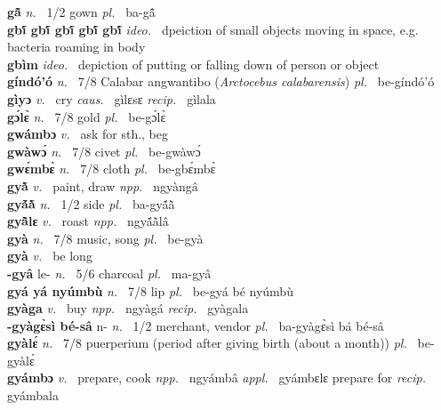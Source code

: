 \noindent
{\bfseries gã̂}  {\itshape n.~} 1/2 gown {\itshape pl.~} ba-gã̂    \\ 
{\bfseries gbĩ́ gbĩ́ gbĩ́ gbĩ́ gbĩ́}  {\itshape ideo.~} dpeiction of small objects moving in space, e.g. bacteria roaming in body    \\ 
{\bfseries gbìm}  {\itshape ideo.~} depiction of putting or falling down of person or object    \\ 
{\bfseries gíndó'ó} {\itshape n.~} 7/8 Calabar angwantibo ({\itshape Arctocebus calabarensis}) {\itshape pl.~} be-gíndó'ó    \\ 
{\bfseries gìyɔ}  {\itshape v.~} cry   {\itshape caus.~} gìlɛsɛ {\itshape recip.~} gìlala  \\ 
{\bfseries gɔ́lɛ̀}  {\itshape n.~} 7/8 gold {\itshape pl.~} be-gɔ́lɛ̀    \\ 
{\bfseries gwámbɔ}  {\itshape v.~} ask for sth., beg    \\ 
{\bfseries gwàwɔ́}  {\itshape n.~} 7/8 civet {\itshape pl.~} be-gwàwɔ́    \\ 
{\bfseries gwɛ́mbɛ̀}  {\itshape n.~} 7/8 cloth {\itshape pl.~} be-gbɛ́mbɛ̀    \\ 
{\bfseries gyã̀}  {\itshape v.~} paint, draw   {\itshape npp.~} ngyàngâ  \\ 
{\bfseries gyã́ã̀}  {\itshape n.~} 1/2 side {\itshape pl.~} ba-gyã́ã̀    \\ 
{\bfseries gyã̂lɛ}  {\itshape v.~} roast   {\itshape npp.~} ngyã́ã̀lâ  \\ 
{\bfseries gyà}  {\itshape n.~} 7/8 music, song {\itshape pl.~} be-gyà    \\ 
{\bfseries gyà}  {\itshape v.~} be long    \\ 
{\bfseries -gyâ} le- {\itshape n.~} 5/6 charcoal {\itshape pl.~} ma-gyâ    \\ 
{\bfseries gyá yá nyúmbù}  {\itshape n.~} 7/8 lip {\itshape pl.~} be-gyá bé nyúmbù    \\ 
{\bfseries gyàga}  {\itshape v.~} buy   {\itshape npp.~} ngyàgá {\itshape recip.~} gyàgala  \\ 
{\bfseries -gyàgɛ̀sì bé-sâ} n- {\itshape n.~} 1/2 merchant, vendor {\itshape pl.~} ba-gyàgɛ̀sì bá bé-sâ    \\ 
{\bfseries gyàlɛ́}  {\itshape n.~} 7/8 puerperium (period after giving birth (about a month)) {\itshape pl.~} be-gyàlɛ́    \\ 
{\bfseries gyámbɔ}  {\itshape v.~} prepare, cook   {\itshape npp.~} ngyámbâ {\itshape appl.~} gyámbɛlɛ prepare for {\itshape recip.~} gyámbala  \\ 
